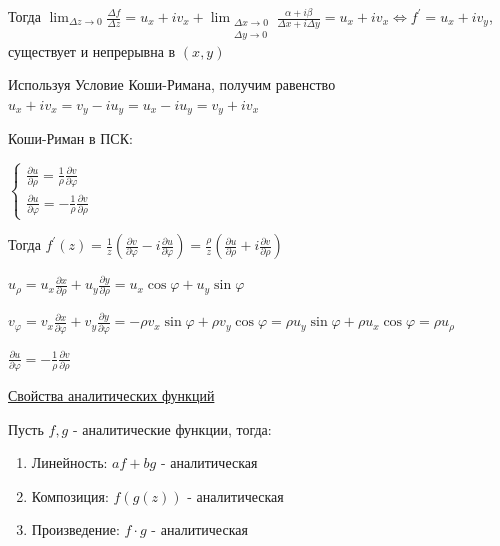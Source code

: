 \begin{MyProof}
    Тогда $\lim_{\Delta z \to 0} \frac{\Delta f}{\Delta z} = 
    u_x + i v_x + \lim_{\substack{\Delta x \to 0 \\ \Delta y \to 0}} \frac{\alpha + i \beta}{\Delta x + i \Delta y} = 
    u_x + i v_x \Longleftrightarrow f^\prime = u_x + i v_y$, существует и непрерывна в $(x, y)$
\end{MyProof}

\Nota Используя Условие Коши-Римана, получим равенство $u_x + i v_x = v_y - i u_y = u_x - i u_y = v_y + i v_x$

\Notas Коши-Риман в ПСК:

$\begin{cases}
    \frac{\partial u}{\partial \rho} = \frac{1}{\rho} \frac{\partial v}{\partial \varphi} \\
    \frac{\partial u}{\partial \varphi} = -\frac{1}{\rho} \frac{\partial v}{\partial \rho}
\end{cases}$

Тогда $f^\prime(z) = \frac{1}{z} \left(\frac{\partial v}{\partial \varphi} - i \frac{\partial u}{\partial \varphi}\right) = \frac{\rho}{z} \left(\frac{\partial u}{\partial \rho} + i \frac{\partial v}{\partial \rho}\right)$

\begin{MyProof}
    $u_\rho = u_x \frac{\partial x}{\partial \rho} + u_y \frac{\partial y}{\partial \rho} = u_x \cos \varphi + u_y \sin \varphi$

    $v_\varphi = v_x \frac{\partial x}{\partial \varphi} + v_y \frac{\partial y}{\partial \varphi} = 
    -\rho v_x \sin \varphi + \rho v_y \cos \varphi = \rho u_y \sin \varphi + \rho u_x \cos \varphi = \rho u_\rho$

    \Lab $\frac{\partial u}{\partial \varphi} = -\frac{1}{\rho} \frac{\partial v}{\partial \rho}$
\end{MyProof}

\mediumvspace

\hypertarget{analytic_function_properties}{}

\underline{Свойства аналитических функций}

Пусть $f, g$ - аналитические функции, тогда:

\begin{enumerate}[label=\arabic*$^\circ$]
    \item Линейность: $af + bg$ - аналитическая
    \item Композиция: $f(g(z))$ - аналитическая
    \item Произведение: $f \cdot g$ - аналитическая
\end{enumerate}

